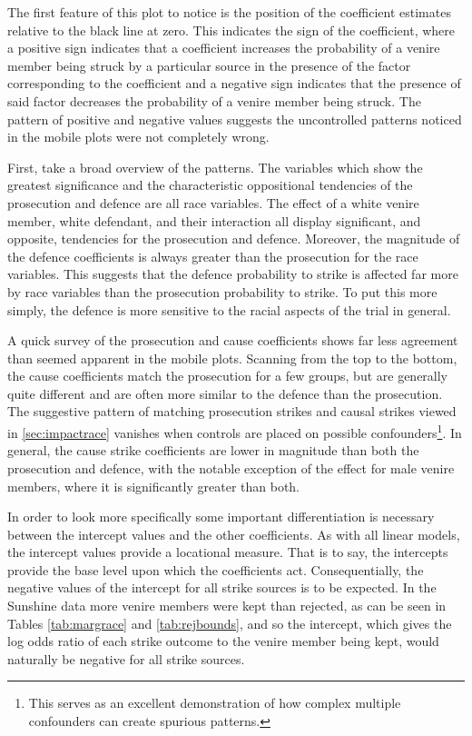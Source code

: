 The first feature of this plot to notice is the position of the coefficient estimates relative to the black line at zero. This
indicates the sign of the coefficient, where a positive sign indicates that a coefficient increases the probability of a venire
member being struck by a particular source in the presence of the factor corresponding to the coefficient and a negative sign
indicates that the presence of said factor decreases the probability of a venire member being struck. The pattern of positive and
negative values suggests the uncontrolled patterns noticed in the mobile plots were not completely wrong.

First, take a broad overview of the patterns. The variables which show the greatest significance and the characteristic
oppositional tendencies of the prosecution and defence are all race variables. The effect of a white venire member, white
defendant, and their interaction all display significant, and opposite, tendencies for the prosecution and defence. Moreover, the
magnitude of the defence coefficients is always greater than the prosecution for the race variables. This suggests that the
defence probability to strike is affected far more by race variables than the prosecution probability to strike. To put this more
simply, the defence is more sensitive to the racial aspects of the trial in general.

A quick survey of the prosecution and cause coefficients shows far less agreement than seemed apparent in the mobile
plots. Scanning from the top to the bottom, the cause coefficients match the prosecution for a few groups, but are generally quite 
different and are often more similar to the defence than the prosecution. The suggestive pattern of matching prosecution strikes
and causal strikes viewed in \ref{sec:impactrace} vanishes when controls are placed on possible confounders\footnote{This serves
  as an excellent demonstration of how complex multiple confounders can create spurious patterns.}. In general, the cause strike
coefficients are lower in magnitude than both the prosecution and defence, with the notable exception of the effect for male
venire members, where it is significantly greater than both.

In order to look more specifically some important differentiation is necessary between the intercept values and the other
coefficients. As with all linear models, the intercept values provide a locational measure. That is to say, the intercepts provide
the base level upon which the coefficients act. Consequentially, the negative values of the intercept for all strike sources is to
be expected. In the Sunshine data more venire members were kept than rejected, as can be seen in Tables \ref{tab:margrace} and
\ref{tab:rejbounds}, and so the intercept, which gives the log odds ratio of each strike outcome to the venire member being kept,
would naturally be negative for all strike sources.

